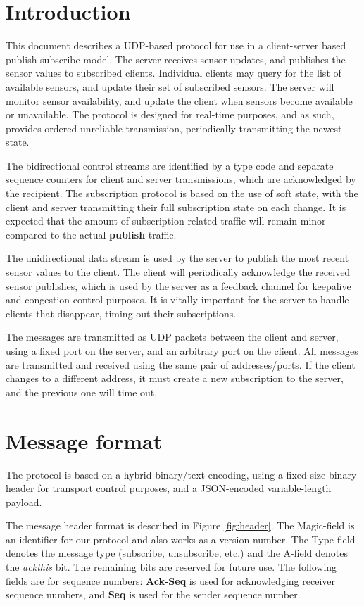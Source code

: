 \documentclass[a4paper]{article}
\begin{document}


\section{Introduction}
This document describes a UDP-based protocol for use in a client-server based publish-subscribe model.
The server receives sensor updates, and publishes the sensor values to subscribed clients.
Individual clients may query for the list of available sensors, and update their set of subscribed sensors.
The server will monitor sensor availability, and update the client when sensors become available or unavailable.
The protocol is designed for real-time purposes, and as such, provides ordered unreliable transmission, periodically transmitting the newest state.

The bidirectional control streams are identified by a type code and separate sequence counters for client and server transmissions, which are acknowledged by the recipient.
The subscription protocol is based on the use of soft state, with the client and server transmitting their full subscription state on each change.
It is expected that the amount of subscription-related traffic will remain minor compared to the actual \textbf{publish}-traffic.

The unidirectional data stream is used by the server to publish the most recent sensor values to the client.
The client will periodically acknowledge the received sensor publishes, which is used by the server as a feedback channel for keepalive and congestion control purposes.
It is vitally important for the server to handle clients that disappear, timing out their subscriptions.

The messages are transmitted as UDP packets between the client and server, using a fixed port on the server, and an arbitrary port on the client.
All messages are transmitted and received using the same pair of addresses/ports.
If the client changes to a different address, it must create a new subscription to the server, and the previous one will time out.

\section{Message format}
The protocol is based on a hybrid binary/text encoding, using a fixed-size binary header for transport control purposes, and a JSON-encoded variable-length payload.

The message header format is described in Figure \ref{fig:header}. The 
Magic-field is an identifier for our protocol and also works as a version
number. The Type-field denotes the message type (subscribe, unsubscribe, etc.)
and the A-field denotes the \textit{ackthis} bit. The remaining bits are reserved for future use. 
The following fields are for sequence numbers: \textbf{Ack-Seq} is used for acknowledging receiver 
sequence numbers, and \textbf{Seq} is used for the sender sequence number.
\end{document}
